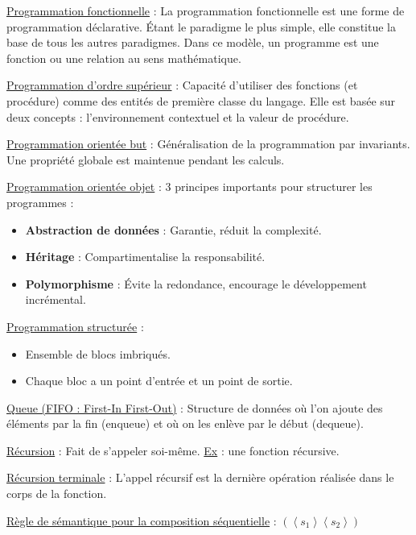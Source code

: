 \documentclass[fr,license=none,skiptoc]{../../../eplsummary}
\begin{document}
\begin{flushleft}
\textcolor{mauvedef}{\underline{Programmation fonctionnelle}} : La programmation fonctionnelle est une forme de programmation déclarative. Étant le paradigme le plus simple, elle constitue la base de tous les autres paradigmes. Dans ce modèle, un programme est une fonction ou une relation au sens mathématique.\bigbreak


\textcolor{mauvedef}{\underline{Programmation d'ordre supérieur}} : Capacité d'utiliser des fonctions (et procédure) comme des entités de première classe du langage. Elle est basée sur deux concepts : l'environnement contextuel et la valeur de procédure. \bigbreak


\textcolor{mauvedef}{\underline{Programmation orientée but}} : Généralisation de la programmation par invariants. Une propriété globale est maintenue pendant les calculs. \bigbreak


\textcolor{mauvedef}{\underline{Programmation orientée objet}} : 3 principes importants pour structurer les programmes :
\begin{itemize}
\item \textbf{Abstraction de données} : Garantie, réduit la complexité.
\item \textbf{Héritage} : Compartimentalise la responsabilité.
\item \textbf{Polymorphisme} : Évite la redondance, encourage le développement incrémental.
\end{itemize}\bigbreak


\textcolor{mauvedef}{\underline{Programmation structurée}} :
\begin{itemize}
\item Ensemble de blocs imbriqués.
\item Chaque bloc a un point d'entrée et un point de sortie.
\end{itemize}\bigbreak



\textcolor{mauvedef}{\underline{Queue (FIFO : First-In First-Out)}} : Structure de données où l’on ajoute des éléments par la fin (enqueue) et où on les enlève par le début (dequeue). \bigbreak


\textcolor{mauvedef}{\underline{Récursion}} : Fait de s'appeler soi-même. \underline{Ex} : une fonction récursive. \bigbreak


\textcolor{mauvedef}{\underline{Récursion terminale}} : L'appel récursif est la dernière opération réalisée dans le corps de la fonction. \bigbreak



\textcolor{mauvedef}{\underline{Règle de sémantique pour la composition séquentielle}} : \textcolor{miorangerouge}{$( \left\langle s_1 \right\rangle \left\langle s_2 \right\rangle )$}


\end{flushleft}
\end{document}
